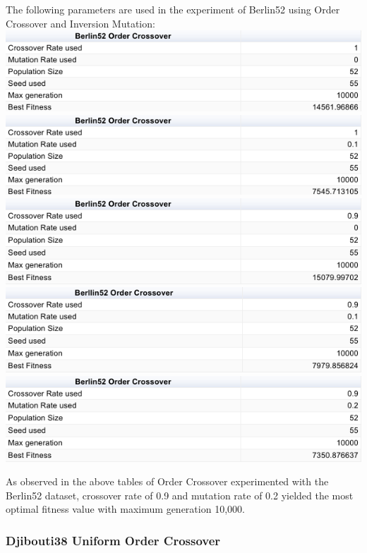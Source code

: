 \documentclass[conference]{IEEEtran}
\begin{document}
The following parameters are used in the experiment of Berlin52 using Order Crossover and Inversion Mutation:
\includegraphics[scale=0.42]{Berlin52/OC/Berlin52_OC_a)_table}
\includegraphics[scale=0.42]{Berlin52/OC/Berlin52_OC_b)_table}
\includegraphics[scale=0.42]{Berlin52/OC/Berlin52_OC_c)_table}
\includegraphics[scale=0.42]{Berlin52/OC/Berlin52_OC_d)_table}
\includegraphics[scale=0.42]{Berlin52/OC/Berlin52_OC_e)_table}


As observed in the above tables of Order Crossover experimented with the Berlin52 dataset, crossover rate of 0.9 and mutation rate of 0.2 yielded the most optimal fitness value with maximum generation 10,000.

\subsubsection{Djibouti38 Uniform Order Crossover}
\end{document}
